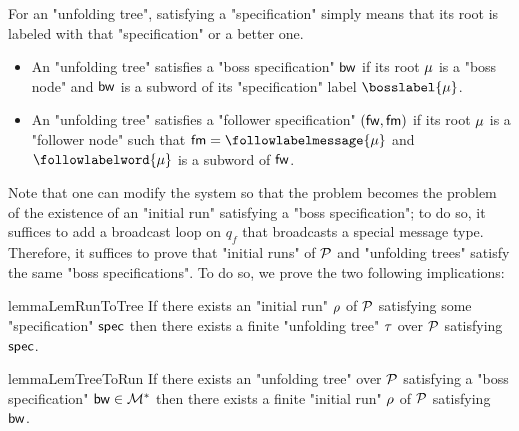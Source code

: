 For an "unfolding tree", satisfying a "specification" simply means that its root is labeled with that "specification" or a better one.

\begin{itemize}
	\item An "unfolding tree" satisfies a "boss specification" $\mathsf{bw}$ if its root $\mu$ is a "boss node" and $\mathsf{bw}$ is a subword of its "specification" label $\bosslabel{\node}$.
	
	\item An "unfolding tree" satisfies a "follower specification" $(\mathsf{fw}, \mathsf{fm})$ if its root $\mu$ is a "follower node" such that $\followmessagespec=\followlabelmessage{\node}$ and  $\followlabelword{\node}$ is a subword of $\mathsf{fw}$.
\end{itemize}

Note that one can modify the system so that the \COVER problem becomes the problem of the existence of an "initial run" satisfying a "boss specification"; to do so, it suffices to add a broadcast loop on $q_f$ that broadcasts a special message type. Therefore, it suffices to prove that "initial runs" of $\mathcal{P}$ and "unfolding trees" satisfy the same "boss specifications". To do so, we prove the two following implications:

\begin{restatable}{lemma}{LemRunToTree}
	\label{lem:run-to-tree}
	If there exists an "initial run" $\rho$ of $\mathcal{P}$ satisfying some "specification" $\mathsf{spec}$ then there exists a finite "unfolding tree" $\tau$ over $\mathcal{P}$ satisfying $\mathsf{spec}$.
\end{restatable}

\begin{restatable}{lemma}{LemTreeToRun}
	\label{lem:tree-to-run}
	If there exists an "unfolding tree" over $\mathcal{P}$ satisfying a "boss specification" $\mathsf{bw} \in \mathcal{M}^*$ then there exists a finite "initial run" $\rho$ of $\mathcal{P}$ satisfying $\mathsf{bw}$.
\end{restatable}


	

